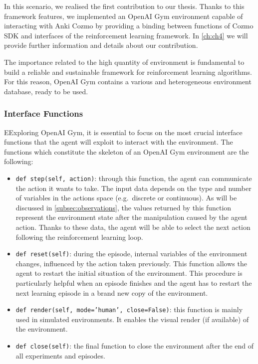 In this scenario, we realised the first contribution to our thesis. Thanks to this framework features, we implemented an OpenAI Gym environment capable of interacting with Anki Cozmo by providing a binding between functions of Cozmo SDK and interfaces of the reinforcement learning framework. In \vref{ch:ch4} we will provide further information and details about our contribution.

The importance related to the high quantity of environment is fundamental to build a reliable and sustainable framework for reinforcement learning algorithms. For this reason, OpenAI Gym contains a various and heterogeneous environment database, ready to be used.

\subsubsection{Interface Functions}

EExploring OpenAI Gym, it is essential to focus on the most crucial interface functions that the agent will exploit to interact with the environment.
The functions which constitute the skeleton of an OpenAI Gym environment are the following:
\begin{itemize}
	\item \texttt{def step(self, action)}: through this function, the agent can communicate the action it wants to take. The input data depends on the type and number of variables in the actions space (e.g.\ discrete or continuous). As will be discussed in \vref{subsec:observations}, the values returned by this function represent the environment state after the manipulation caused by the agent action. Thanks to these data, the agent will be able to select the next action following the reinforcement learning loop.
	\item \texttt{def reset(self)}: during the episode, internal variables of the environment changes, influenced by the action taken previously. This function allows the agent to restart the initial situation of the environment. This procedure is particularly helpful when an episode finishes and the agent has to restart the next learning episode in a brand new copy of the environment.
	\item \texttt{def render(self, mode='human', close=False)}: this function is mainly used in simulated environments. It enables the visual render (if available) of the environment.
	\item \texttt{def close(self)}: the final function to close the environment after the end of all experiments and episodes.
\end{itemize}

